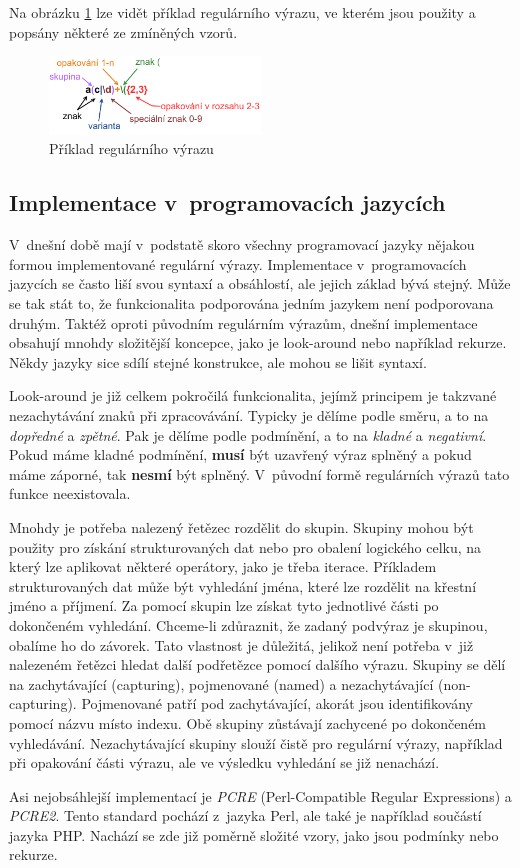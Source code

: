 Na obrázku \ref{fig:REGEXEXMP} lze vidět příklad regulárního výrazu, ve kterém jsou použity a popsány některé ze zmíněných vzorů.

\begin{figure}[!h]
	\centering
	\includegraphics[width=0.5\textwidth]{Figures/regex_exmp.pdf}
	\caption{Příklad regulárního výrazu}
	\label{fig:REGEXEXMP}
\end{figure}

\subsection*{Implementace v~programovacích jazycích}\label{sec:impipl}

V~dnešní době mají v~podstatě skoro všechny programovací jazyky nějakou formou implementované regulární výrazy.
Implementace v~programovacích jazycích se často liší svou syntaxí a obsáhlostí, ale jejich základ bývá stejný.
Může se tak stát to, že funkcionalita podporována jedním jazykem není podporovana druhým.
Taktéž oproti původním regulárním výrazům, dnešní implementace obsahují mnohdy složitější koncepce, jako je look-around nebo například rekurze.
Někdy jazyky sice sdílí stejné konstrukce, ale mohou se lišit syntaxí.

Look-around je již celkem pokročilá funkcionalita, jejímž principem je takzvané nezachytávání znaků při zpracovávání.
Typicky je dělíme podle směru, a to na \textit{dopředné} a \textit{zpětné}.
Pak je dělíme podle podmínění, a to na \textit{kladné} a \textit{negativní}.
Pokud máme kladné podmínění, \textbf{musí} být uzavřený výraz splněný a pokud máme záporné, tak \textbf{nesmí} být splněný.
V~původní formě regulárních výrazů tato funkce neexistovala.

Mnohdy je potřeba nalezený řetězec rozdělit do skupin.
Skupiny mohou být použity pro získání strukturovaných dat nebo pro obalení logického celku, na který lze aplikovat některé operátory, jako je třeba iterace.
Příkladem strukturovaných dat může být vyhledání jména, které lze rozdělit na křestní jméno a příjmení.
Za pomocí skupin lze získat tyto jednotlivé části po dokončeném vyhledání. 
Chceme-li zdůraznit, že zadaný podvýraz je skupinou, obalíme ho do závorek.
Tato vlastnost je důležitá, jelikož není potřeba v~již nalezeném řetězci hledat další podřetězce pomocí dalšího výrazu.
Skupiny se dělí na zachytávající (capturing), pojmenované (named) a nezachytávající (non-capturing).
Pojmenované patří pod zachytávající, akorát jsou identifikovány pomocí názvu místo indexu.
Obě skupiny zůstávají zachycené po dokončeném vyhledávání.
Nezachytávající skupiny slouží čistě pro regulární výrazy, například při opakování části výrazu, ale ve výsledku vyhledání se již nenachází.

Asi nejobsáhlejší implementací je \textit{PCRE} (Perl-Compatible Regular Expressions) a \textit{PCRE2}.
Tento standard pochází z~jazyka Perl, ale také je například součástí jazyka PHP.
Nachází se zde již poměrně složité vzory, jako jsou podmínky nebo rekurze.

\endinput
